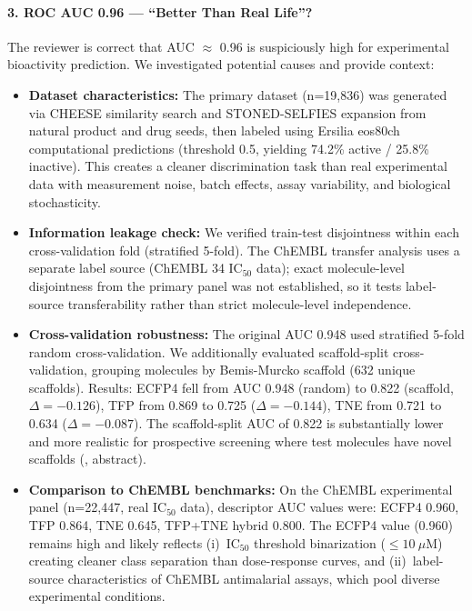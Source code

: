 \documentclass[11pt]{article}
\begin{document}
\paragraph{3. ROC AUC 0.96 — ``Better Than Real Life''?}
The reviewer is correct that AUC $\approx$ 0.96 is suspiciously high for experimental bioactivity 
prediction. We investigated potential causes and provide context:

\begin{itemize}[leftmargin=1.6em]
\item \textbf{Dataset characteristics:} The primary dataset (n=19,836) was generated via CHEESE 
similarity search and STONED-SELFIES expansion from natural product and drug seeds, then 
labeled using Ersilia eos80ch computational predictions (threshold 0.5, yielding 74.2\% active / 
25.8\% inactive). This creates a cleaner discrimination task than real experimental data with 
measurement noise, batch effects, assay variability, and biological stochasticity.

\item \textbf{Information leakage check:} We verified train-test disjointness within each 
cross-validation fold (stratified 5-fold). The ChEMBL transfer analysis uses a separate label 
source (ChEMBL 34 IC$_{50}$ data); exact molecule-level disjointness from the primary panel 
was not established, so it tests label-source transferability rather than strict molecule-level 
independence.

\item \textbf{Cross-validation robustness:} The original AUC 0.948 used stratified 5-fold 
random cross-validation. We additionally evaluated scaffold-split cross-validation, grouping 
molecules by Bemis-Murcko scaffold (632 unique scaffolds). Results: ECFP4 fell from AUC 0.948 
(random) to 0.822 (scaffold, $\Delta = -0.126$), TFP from 0.869 to 0.725 ($\Delta = -0.144$), 
TNE from 0.721 to 0.634 ($\Delta = -0.087$). The scaffold-split AUC of 0.822 is substantially 
lower and more realistic for prospective screening where test molecules have novel scaffolds 
(, abstract).

\item \textbf{Comparison to ChEMBL benchmarks:} On the ChEMBL experimental panel (n=22,447, 
real IC$_{50}$ data), descriptor AUC values were: ECFP4 0.960, TFP 0.864, TNE 0.645, TFP+TNE 
hybrid 0.800. The ECFP4 value (0.960) remains high and likely reflects (i)~IC$_{50}$ threshold 
binarization ($\leq 10~\mu$M) creating cleaner class separation than dose-response curves, 
and (ii)~label-source characteristics of ChEMBL antimalarial assays, which pool diverse 
experimental conditions.
\end{itemize}
\end{document}
